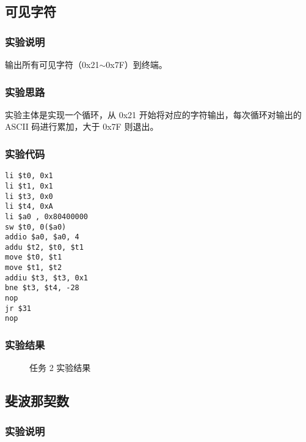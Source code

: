 \documentclass[a4paper]{article}
\begin{document}
        \newpage

    \subsection{可见字符}

        \subsubsection{实验说明}
        
            输出所有可见字符（0x21$\sim$0x7F）到终端。
        
        \subsubsection{实验思路}

            实验主体是实现一个循环，从 0x21 开始将对应的字符输出，每次循环对输出的 ASCII 码进行累加，大于 0x7F 则退出。
        
        \subsubsection{实验代码}

            \begin{lstlisting}
li $t0, 0x1
li $t1, 0x1
li $t3, 0x0
li $t4, 0xA
li $a0 , 0x80400000
sw $t0, 0($a0)
addio $a0, $a0, 4
addu $t2, $t0, $t1
move $t0, $t1
move $t1, $t2
addiu $t3, $t3, 0x1
bne $t3, $t4, -28
nop
jr $31
nop
            \end{lstlisting}

        \subsubsection{实验结果}

            \begin{figure}[H]
                \centering
                \caption{任务 2 实验结果}
            \end{figure}

        \newpage

    \subsection{斐波那契数}

        \subsubsection{实验说明}
        
\end{document}
